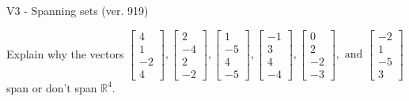 \begin{exercise}
  \begin{exerciseTitle}V3 - Spanning sets (ver. 919)\end{exerciseTitle}
  \begin{exerciseStatement}
    Explain why the vectors \(\left[\begin{array}{r}
4 \\
1 \\
-2 \\
4
\end{array}\right] , \left[\begin{array}{r}
2 \\
-4 \\
2 \\
-2
\end{array}\right] , \left[\begin{array}{r}
1 \\
-5 \\
4 \\
-5
\end{array}\right] , \left[\begin{array}{r}
-1 \\
3 \\
4 \\
-4
\end{array}\right] , \left[\begin{array}{r}
0 \\
2 \\
-2 \\
-3
\end{array}\right] , \text{ and } \left[\begin{array}{r}
-2 \\
1 \\
-5 \\
3
\end{array}\right]\) span or don't span \(\mathbb{R}^4\). 
	



\end{exerciseStatement}
\end{exercise}
